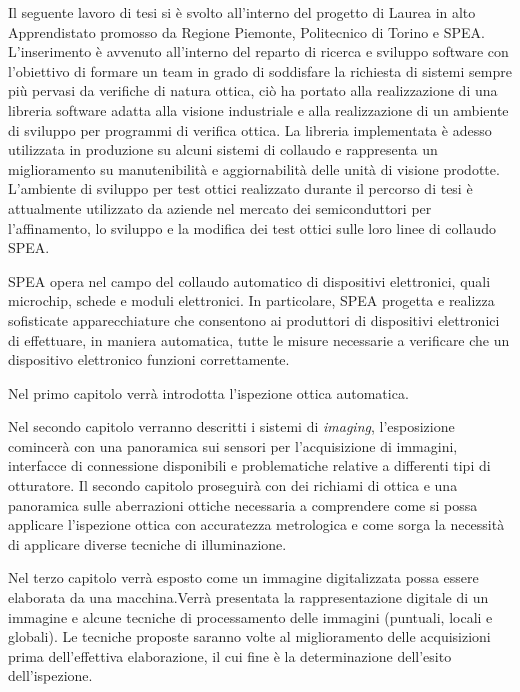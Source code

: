\sommario

Il seguente lavoro di tesi si è svolto all'interno del progetto di Laurea in alto Apprendistato promosso da Regione Piemonte, Politecnico di Torino e SPEA.
L'inserimento è avvenuto all'interno del reparto di ricerca e sviluppo software con l'obiettivo di formare un team in grado di soddisfare la richiesta di sistemi sempre più pervasi da verifiche di natura ottica, ciò ha portato alla realizzazione di una libreria software adatta alla visione industriale e alla realizzazione di un ambiente di sviluppo per programmi di verifica ottica. La libreria implementata è adesso utilizzata in produzione su alcuni sistemi di collaudo e rappresenta un miglioramento su manutenibilità e aggiornabilità delle unità di visione prodotte. L'ambiente di sviluppo per test ottici realizzato durante il percorso di tesi è attualmente utilizzato da aziende nel mercato dei semiconduttori per l'affinamento, lo sviluppo e la modifica dei test ottici sulle loro linee di collaudo SPEA. 

SPEA opera nel campo del collaudo automatico di dispositivi elettronici, quali microchip, schede e moduli elettronici. In particolare, SPEA progetta e realizza sofisticate apparecchiature che consentono ai produttori di dispositivi elettronici di effettuare, in maniera automatica, tutte le misure necessarie a verificare che un dispositivo elettronico funzioni correttamente. 

Nel primo capitolo verrà introdotta l'ispezione ottica automatica.

Nel secondo capitolo verranno descritti i sistemi di \emph{imaging}, l'esposizione comincerà con una panoramica sui sensori per l'acquisizione di immagini, interfacce di connessione disponibili e problematiche relative a differenti tipi di otturatore. Il secondo capitolo proseguirà con dei richiami di ottica e una panoramica sulle aberrazioni ottiche necessaria a comprendere come si possa applicare l'ispezione ottica con accuratezza metrologica e come sorga la necessità di applicare diverse tecniche di illuminazione.

Nel terzo capitolo verrà esposto come un immagine digitalizzata possa essere elaborata da una macchina.Verrà presentata la rappresentazione digitale di un immagine e alcune tecniche di processamento delle immagini (puntuali, locali e globali). Le tecniche proposte saranno volte al miglioramento delle acquisizioni prima dell'effettiva elaborazione, il cui fine è la determinazione dell'esito dell'ispezione.

